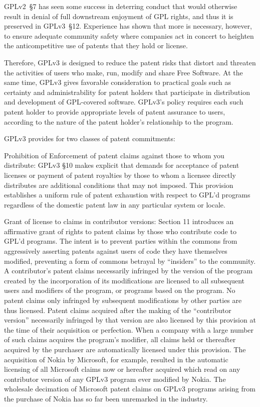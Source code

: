 GPLv2~\S7 has seen some success in deterring conduct that would otherwise
result in denial of full downstream enjoyment of GPL rights, and thus it is
preserved in GPLv3~\S12.  Experience has shown that more is necessary,
however, to ensure adequate community safety where companies act in concert
to heighten the anticompetitive use of patents that they hold or license.

Therefore,  GPLv3 is designed to reduce the patent risks that distort and
threaten the activities of users who make, run, modify and share Free
Software.  At the same time, GPLv3 gives favorable consideration to practical
goals such as certainty and administrability for patent holders that
participate in distribution and development of GPL-covered software.  GPLv3's
policy requires each such patent holder to provide appropriate levels of
patent assurance to users, according to the nature of the patent holder's
relationship to the program.


GPLv3 provides for two classes of patent commitments:

    Prohibition of Enforcement of patent claims against those to whom you
    distribute: GPLv3 \S10 makes explicit that demands for acceptance of
    patent licenses or payment of patent royalties by those to whom a
    licensee directly distributes are additional conditions that may not
    imposed. This provision establishes a uniform rule of patent exhaustion
    with respect to GPL’d programs regardless of the domestic patent law in
    any particular system or locale.

    Grant of license to claims in contributor versions: Section 11 introduces
    an affirmative grant of rights to patent claims by those who contribute
    code to GPL’d programs. The intent is to prevent parties within the
    commons from aggressively asserting patents against users of code they
    have themselves modified, preventing a form of commons betrayal by
    ``insiders'' to the community. A contributor’s patent claims necessarily
    infringed by the version of the program created by the incorporation of
    its modifications are licensed to all subsequent users and modifiers of
    the program, or programs based on the program. No patent claims only
    infringed by subsequent modifications by other parties are thus
    licensed. Patent claims acquired after the making of the ``contributor
    version'' necessarily infringed by that version are also licensed by this
    provision at the time of their acquisition or perfection. When a company
    with a large number of such claims acquires the program’s modifier, all
    claims held or thereafter acquired by the purchaser are automatically
    licensed under this provision. The acquisition of Nokia by Microsoft, for
    example, resulted in the automatic licensing of all Microsoft claims now
    or hereafter acquired which read on any contributor version of any GPLv3
    program ever modified by Nokia. The wholesale decimation of Microsoft
    patent claims on GPLv3 programs arising from the purchase of Nokia has so
    far been unremarked in the industry.

